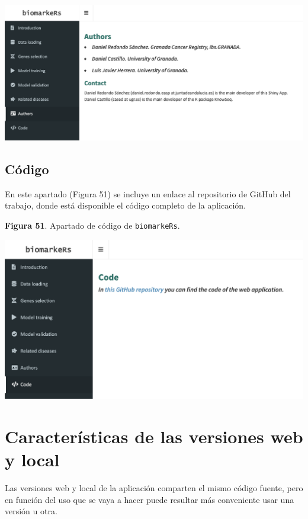 \begin{center}
	\includegraphics[width=.90\textwidth]{figuras/50_authors.png} \\
\end{center}

\subsection{Código}

En este apartado (Figura 51) se incluye un enlace al repositorio de GitHub del trabajo, donde está disponible el código completo de la aplicación.

\begin{center}
	\textbf{Figura 51}. Apartado de código  de \texttt{biomarkeRs}.
\end{center}

\begin{center}
	\includegraphics[width=.80\textwidth]{figuras/51_code.png} \\
\end{center}

\section{Características de las versiones web y local}

Las versiones web y local de la aplicación comparten el mismo código fuente, pero en función del uso que se vaya a hacer puede resultar más conveniente usar una versión u otra.\\

